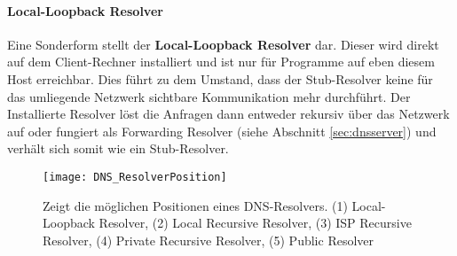 \paragraph{Local-Loopback Resolver}
Eine Sonderform stellt der \textbf{Local-Loopback Resolver} dar. Dieser wird direkt auf dem Client-Rechner installiert und ist nur für Programme auf eben diesem Host erreichbar. Dies führt zu dem Umstand, dass der Stub-Resolver keine für das umliegende Netzwerk sichtbare Kommunikation mehr durchführt. Der Installierte Resolver löst die Anfragen dann entweder rekursiv über das Netzwerk auf oder fungiert als Forwarding Resolver (siehe Abschnitt \ref{sec:dnsserver}) und verhält sich somit wie ein Stub-Resolver.

\begin{figure}[htbp]
    \centering
    \texttt{[image: DNS\_ResolverPosition]}
    \caption{Zeigt die möglichen Positionen eines DNS-Resolvers. (1) Local-Loopback Resolver, (2) Local Recursive Resolver, (3) ISP Recursive Resolver, (4) Private Recursive Resolver, (5) Public Resolver}
    \label{img:dnsresolverposition}
\end{figure}
